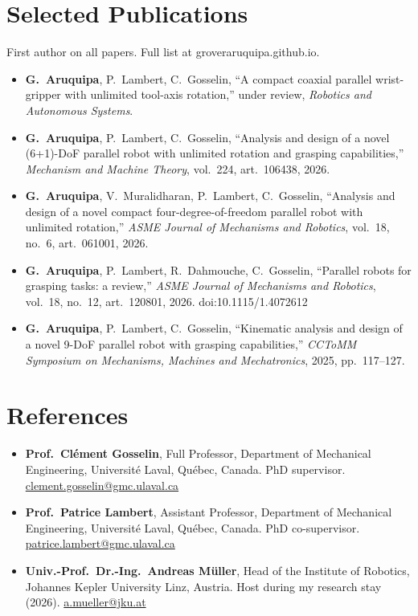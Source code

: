 \documentclass[10pt,letterpaper]{article}
\begin{document}
\section{Selected Publications}
{\small First author on all papers. Full list at groveraruquipa.github.io.}\par\vspace{2pt}
\begin{itemize}
\item \textbf{G.~Aruquipa}, P.~Lambert, C.~Gosselin, ``A compact coaxial parallel wrist-gripper with unlimited tool-axis rotation,'' under review, \emph{Robotics and Autonomous Systems}.
\item \textbf{G.~Aruquipa}, P.~Lambert, C.~Gosselin, ``Analysis and design of a novel (6+1)-DoF parallel robot with unlimited rotation and grasping capabilities,'' \emph{Mechanism and Machine Theory}, vol.~224, art.~106438, 2026.
\item \textbf{G.~Aruquipa}, V.~Muralidharan, P.~Lambert, C.~Gosselin, ``Analysis and design of a novel compact four-degree-of-freedom parallel robot with unlimited rotation,'' \emph{ASME Journal of Mechanisms and Robotics}, vol.~18, no.~6, art.~061001, 2026.
\item \textbf{G.~Aruquipa}, P.~Lambert, R.~Dahmouche, C.~Gosselin, ``Parallel robots for grasping tasks: a review,'' \emph{ASME Journal of Mechanisms and Robotics}, vol.~18, no.~12, art.~120801, 2026. doi:10.1115/1.4072612
\item \textbf{G.~Aruquipa}, P.~Lambert, C.~Gosselin, ``Kinematic analysis and design of a novel 9-DoF parallel robot with grasping capabilities,'' \emph{CCToMM Symposium on Mechanisms, Machines and Mechatronics}, 2025, pp.~117--127.
\end{itemize}

\section{References}
\begin{itemize}
\item \textbf{Prof.~Cl\'ement Gosselin}, Full Professor, Department of Mechanical Engineering, Universit\'e Laval, Qu\'ebec,
Canada. PhD supervisor. \href{mailto:clement.gosselin@gmc.ulaval.ca}{clement.gosselin@gmc.ulaval.ca}
\item \textbf{Prof.~Patrice Lambert}, Assistant Professor, Department of Mechanical Engineering, Universit\'e Laval,
Qu\'ebec, Canada. PhD co-supervisor. \href{mailto:patrice.lambert@gmc.ulaval.ca}{patrice.lambert@gmc.ulaval.ca}
\item \textbf{Univ.-Prof.~Dr.-Ing.~Andreas M\"uller}, Head of the Institute of Robotics, Johannes Kepler University Linz,
Austria. Host during my research stay (2026). \href{mailto:a.mueller@jku.at}{a.mueller@jku.at}
\end{itemize}
\end{document}

